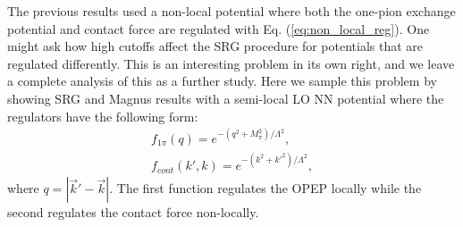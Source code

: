 \documentclass[preprintnumbers,floatfix,aps,prc,preprint]{revtex4-1}
\begin{document}
The previous results used a non-local potential where both the one-pion exchange potential and contact force are regulated with Eq. (\ref{eq:non_local_reg}). One might ask how high cutoffs affect the SRG procedure for potentials that are regulated differently. This is an interesting problem in its own right, and we leave a complete analysis of this as a further study. Here we sample this problem by showing SRG and Magnus results with a semi-local LO NN potential \cite{Reinert:2018} where the regulators have the following form:
%
\begin{subequations}
\label{eq:semi_local_regulator}
\begin{eqnarray}
f_{1\pi}(q) = e^{-(q^2+M_{\pi}^2)/\Lambda^2},
\label{eq:opep_regulator} \\
%
f_{cont}(k',k) = e^{-(k^2+k'^2)/\Lambda^2},
\label{eq:contact_regulator}
\end{eqnarray}
\end{subequations}
%
where $q=|\vec{k}'-\vec{k}|$. The first function regulates the OPEP locally while the second regulates the contact force non-locally. \\
\end{document}
